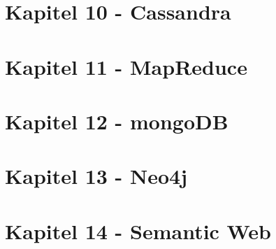 \documentclass[a4paper,11pt]{article}
\begin{document}
\section{Kapitel 10 - Cassandra}
\section{Kapitel 11 - MapReduce}
\section{Kapitel 12 - mongoDB}
\section{Kapitel 13 - Neo4j}
\section{Kapitel 14 - Semantic Web}
\end{document}
